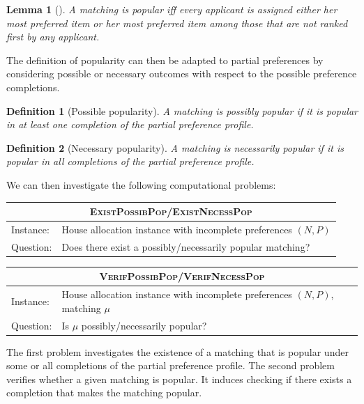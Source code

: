 \documentclass{article}
\newcommand{\match}{\mu}
\newtheorem{definition}{Definition}
\newtheorem{lemma}{Lemma}
\begin{document}
\begin{lemma}[\citet{abraham2007popular}]\label{lem:charact-pop}
A matching is popular iff every applicant is assigned either her most preferred item or her most preferred item among those that are not ranked first by any applicant.
\end{lemma}

The definition of popularity can then be adapted to partial preferences by considering possible or necessary outcomes with respect to the possible preference completions.

\begin{definition}[Possible popularity]
A matching is possibly popular if it is popular in at least one completion of the partial preference profile.
\end{definition}

\begin{definition}[Necessary popularity]
A matching is necessarily popular if it is popular in all completions of the partial preference profile. 
\end{definition}

We can then investigate the following computational problems:
\begin{center}
    \smallbreak
\begin{tabular}{ll}
\toprule
\multicolumn{2}{c}{\textsc{ExistPossibPop}/\textsc{ExistNecessPop}} \\
\midrule
Instance: & House allocation instance with incomplete preferences $(N,P)$ \\
Question: & Does there exist a possibly/necessarily popular matching? \\
\bottomrule
\end{tabular}

\smallbreak
\begin{tabular}{ll}
\toprule
\multicolumn{2}{c}{\textsc{VerifPossibPop}/\textsc{VerifNecessPop}} \\
\midrule
Instance: & House allocation instance with incomplete preferences $(N,P)$, matching $\match$ \\
Question: & Is $\match$ possibly/necessarily popular? \\
\bottomrule
\end{tabular}
\end{center}


The first problem investigates the existence of a matching that is popular under some or all completions of the partial preference profile.
The second problem verifies whether a given matching is popular. It induces checking if there exists a completion that makes the matching popular.
\end{document}
